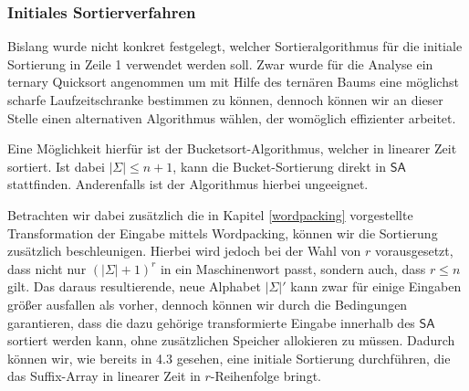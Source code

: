 \subsubsection{Initiales Sortierverfahren}
Bislang wurde nicht konkret festgelegt, welcher Sortieralgorithmus für die initiale Sortierung in Zeile 1 verwendet werden soll. Zwar wurde für die Analyse ein ternary Quicksort angenommen um mit Hilfe des ternären Baums eine möglichst scharfe Laufzeitschranke bestimmen zu können, dennoch können wir an dieser Stelle einen alternativen Algorithmus wählen, der womöglich effizienter arbeitet.

Eine Möglichkeit hierfür ist der Bucketsort-Algorithmus, welcher in linearer Zeit sortiert. Ist dabei $|\Sigma| \leq n+1$, kann die Bucket-Sortierung direkt in $\mathsf{SA}$ stattfinden. Anderenfalls ist der Algorithmus hierbei ungeeignet.

Betrachten wir dabei zusätzlich die in Kapitel \ref{wordpacking} vorgestellte Transformation der Eingabe mittels Wordpacking, können wir die Sortierung zusätzlich beschleunigen. Hierbei wird jedoch bei der Wahl von $r$ vorausgesetzt, dass nicht nur $(|\Sigma| + 1)^r$ in ein Maschinenwort passt, sondern auch, dass $r \leq  n$ gilt. Das daraus resultierende, neue Alphabet $|\Sigma|'$ kann zwar für einige Eingaben größer ausfallen als vorher, dennoch können wir durch die Bedingungen garantieren, dass die dazu gehörige transformierte Eingabe innerhalb des $\mathsf{SA}$ sortiert werden kann, ohne zusätzlichen Speicher allokieren zu müssen. Dadurch können wir, wie bereits in 4.3 gesehen, eine initiale Sortierung durchführen, die das Suffix-Array in linearer Zeit in $r$-Reihenfolge bringt.